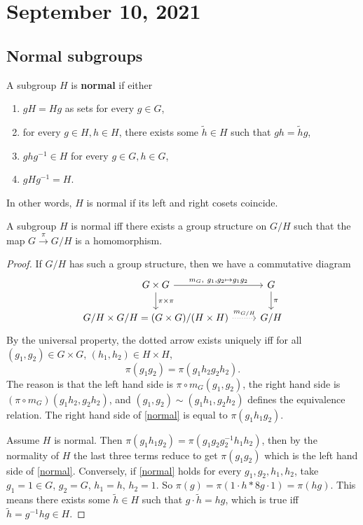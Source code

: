 \section{September 10, 2021} 
\subsection{Normal subgroups}

\begin{definition}[]
    A subgroup $H$ is \textbf{normal} if either
    \begin{enumerate}[label=(\alph*)]
    \setlength\itemsep{-.2em}
        \item $gH=Hg$ as sets for every $g \in G$,
        \item for every $g \in H, h \in H$, there exists some $\widetilde h \in H$ such that $gh=\widetilde hg$, 
        \item $gh g ^{-1} \in H$ for every $g \in G,h \in G$,
        \item $g H g^{-1}=H$.
    \end{enumerate}
In other words, $H$ is normal if its left and right cosets coincide.
\end{definition}
\begin{lemma}
    A subgroup $H$ is normal iff there exists a group structure on $G /H$ such that the map $G \xrightarrow{\pi} G /H$ is a homomorphism.
\end{lemma}
\begin{proof}
    If $G /H$ has such a group structure, then we have a commutative diagram \[
    \begin{tikzcd}
G\times G \arrow[r, "{m_G,\ g_1,g_2\mapsto g_1g_2}"] \arrow[d, "\pi \times \pi"] & G \arrow[d, "\pi"] \\
G/H\times G/H=(G\times G)/(H\times H) \arrow[r, dotted, "m_{G/H}"]                       & G/H               
\end{tikzcd}
    \] By the universal property, the dotted arrow exists uniquely iff for all $(g_1,g_2) \in G \times G$, $(h_1,h_2) \in H \times H$, 
    \begin{equation}\label{normal} 
    \pi(g_1g_2)=\pi(g_1h_2g_2h_2). 
    \end{equation}
    The reason is that the left hand side is $\pi \circ m_G(g_1,g_2)$, the right hand side is $(\pi \circ m_G)(g_1h_2,g_2h_2)$, and $(g_1,g_2)\sim (g_1h_1,g_2h_2)$ defines the equivalence relation. The right hand side of \cref{normal} is equal to $\pi(g_1h_1g_2)$.

    Assume $H$ is normal. Then $\pi(g_1h_1g_2)=\pi(g_1g_2g_2^{-1}h_1h_2)$, then by the normality of $H$ the last three terms reduce to get $\pi(g_1g_2)$ which is the left hand side of \cref{normal}. Conversely, if  \cref{normal} holds for every $g_1,g_2,h_1,h_2$, take $g_1=1 \in G$, $g_2=G$, $h_1=h$, $h_2=1$. So $\pi(g)=\pi(1 \cdot h *8g \cdot 1)=\pi(hg)$. This means there exists some $\widetilde h \in H$ such that $g \cdot \widetilde h=hg$, which is true iff $\widetilde h= g ^{-1} h g \in H$.
\end{proof}

